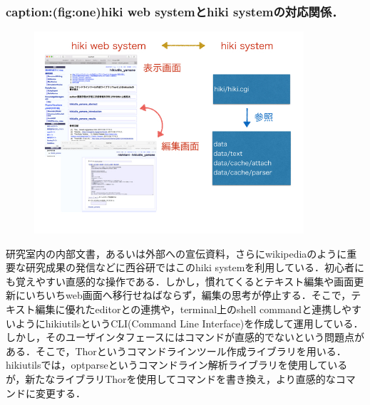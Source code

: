\subsubsection{caption:(fig:one)hiki web systemとhiki systemの対応関係．}
\begin{figure}[htbp]\begin{center}
\includegraphics[width=10cm,bb= 0 0 737 553]{../figs/./hikiutils_yamane.001.jpg}
\caption{}
\label{default}\end{center}\end{figure}
研究室内の内部文書，あるいは外部への宣伝資料，さらにwikipediaのように重要な研究成果の発信などに西谷研ではこのhiki systemを利用している．初心者にも覚えやすい直感的な操作である．しかし，慣れてくるとテキスト編集や画面更新にいちいちweb画面へ移行せねばならず，編集の思考が停止する．そこで，テキスト編集に優れたeditorとの連携や，terminal上のshell commandと連携しやすいようにhikiutilsというCLI(Command Line Interface)を作成して運用している．しかし，そのユーザインタフェースにはコマンドが直感的でないという問題点がある．そこで，Thorというコマンドラインツール作成ライブラリを用いる．hikiutilsでは，optparseというコマンドライン解析ライブラリを使用しているが，新たなライブラリThorを使用してコマンドを書き換え，より直感的なコマンドに変更する．

